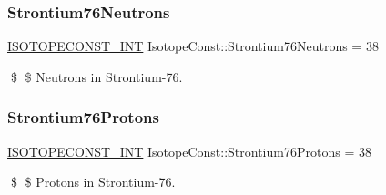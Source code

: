 \subsubsection{\texorpdfstring{Strontium76\+Neutrons}{Strontium76Neutrons}}
{\footnotesize\ttfamily \mbox{\hyperlink{group___isotope_const-_macros_ga5f18360b3e99483a35c32d789e62621c}{I\+S\+O\+T\+O\+P\+E\+C\+O\+N\+S\+T\+\_\+\+I\+NT}} Isotope\+Const\+::\+Strontium76\+Neutrons = 38}

\$ \$ Neutrons in Strontium-\/76. \mbox{\label{group___isotope_const-_strontium-_sr76_gac5fcac0938b58fa366c4a2a82d13e251}} 
\subsubsection{\texorpdfstring{Strontium76\+Protons}{Strontium76Protons}}
{\footnotesize\ttfamily \mbox{\hyperlink{group___isotope_const-_macros_ga5f18360b3e99483a35c32d789e62621c}{I\+S\+O\+T\+O\+P\+E\+C\+O\+N\+S\+T\+\_\+\+I\+NT}} Isotope\+Const\+::\+Strontium76\+Protons = 38}

\$ \$ Protons in Strontium-\/76. 
